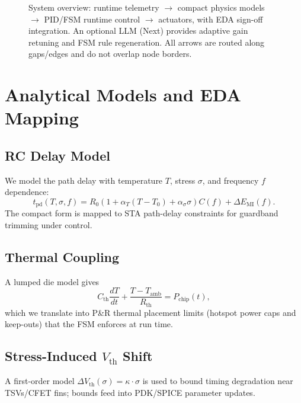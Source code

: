 \documentclass[conference]{IEEEtran}
\begin{document}
\begin{figure}[t]

\caption{System overview: runtime telemetry $\rightarrow$ compact physics models
$\rightarrow$ PID/FSM runtime control $\rightarrow$ actuators, with EDA sign-off
integration. An optional LLM (Next) provides adaptive gain retuning and FSM rule
regeneration. All arrows are routed along gaps/edges and do not overlap node
borders.}
\label{fig:system}
\end{figure}

\section{Analytical Models and EDA Mapping}
\subsection{RC Delay Model}
We model the path delay with temperature $T$, stress $\sigma$, and frequency $f$ dependence:
\begin{equation}
t_{\mathrm{pd}}(T,\sigma,f)=R_0\!\left(1+\alpha_T(T-T_0)+\alpha_\sigma\sigma\right)C(f)+\Delta E_{\mathrm{MI}}(f).
\end{equation}
The compact form is mapped to STA path-delay constraints for guardband trimming under control.

\subsection{Thermal Coupling}
A lumped die model gives
\begin{equation}
C_{\mathrm{th}}\frac{dT}{dt}+\frac{T-T_{\mathrm{amb}}}{R_{\mathrm{th}}}=P_{\mathrm{chip}}(t),
\end{equation}
which we translate into P\&R thermal placement limits (hotspot power caps and keep-outs) that the FSM enforces at run time.

\subsection{Stress-Induced $V_{\mathrm{th}}$ Shift}
A first-order model $\Delta V_{\mathrm{th}}(\sigma)=\kappa\cdot\sigma$ is used to bound timing degradation near TSVs/CFET fins; bounds feed into PDK/SPICE parameter updates.
\end{document}
